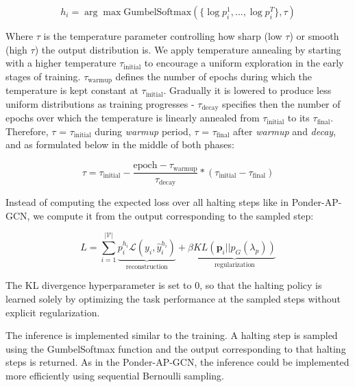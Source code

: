 \documentclass{gdl}
\begin{document}
\begin{equation}
    h_i = \arg\max \text{GumbelSoftmax}(\{\log p_i^1,...,\log p_i^{T}\}, \tau)
\end{equation}

\noindent Where $\tau$ is the temperature parameter controlling how sharp (low $\tau$) or smooth (high $\tau$) the output distribution is. We apply temperature annealing by starting with a higher temperature $\tau_{\text{initial}}$ to encourage a uniform exploration in the early stages of training. $\tau_{\text{warmup}}$ defines the number of epochs during which the temperature is kept constant at $\tau_{\text{initial}}$. Gradually it is lowered to produce less uniform distributions as training progresses - $\tau_{\text{decay}}$ specifies then the number of epochs over which the temperature is linearly annealed from $\tau_{\text{initial}}$ to its $\tau_{\text{final}}$.
Therefore, $\tau$ = $\tau_{\text{initial}}$ during \textit{warmup} period, $\tau$ = $\tau_{\text{final}}$ after \textit{warmup} and \textit{decay}, and as formulated below in the middle of both phases:

\begin{equation}
\tau = \tau_{\text{initial}} - \frac{\text{epoch} - \tau_{\text{warmup}}}{\tau_{\text{decay}}}  * (\tau_{\text{initial}} - \tau_{\text{final}})
\end{equation}

Instead of computing the expected loss over all halting steps like in Ponder-AP-GCN, we compute it from the output corresponding to the sampled step:

\begin{equation}
L = \sum_{i=1}^{\mathcal{|V|}} \underbrace{p_i^{h_i} \mathcal{L}(y_i, \hat{y}_i^{h_i})}_{\text{reconstruction}} + \beta \underbrace{KL(\mathbf{p}_i || p_G(\lambda_p))}_{\text{regularization}}
\end{equation}

\noindent The KL divergence hyperparameter is set to 0, so that the halting policy is learned solely by optimizing the task performance at the sampled steps without explicit regularization. 

The inference is implemented similar to the training. A halting step is sampled using the GumbelSoftmax function and the output corresponding to that halting steps is returned. As in the Ponder-AP-GCN, the inference could be implemented more efficiently using sequential Bernoulli sampling.
\end{document}
